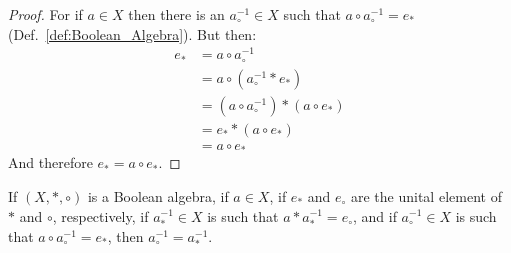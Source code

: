     \begin{proof}
        For if $a\in{X}$ then there is an $a_{\circ}^{\minus{1}}\in{X}$ such
        that $a\circ{a}_{\circ}^{\minus{1}}=e_{*}$
        (Def.~\ref{def:Boolean_Algebra}). But then:
        \begin{align}
            e_{*}&=a\circ{a}_{\circ}^{\minus{1}}
            \tag{Complement Property}\\
            &=a\circ(a_{\circ}^{\minus{1}}*e_{*})
            \tag{Identity}\\
            &=(a\circ{a}_{\circ}^{\minus{1}})*(a\circ{e}_{*})
            \tag{Distributivity}\\
            &=e_{*}*(a\circ{e}_{*})
            \tag{Complement Property}\\
            &=a\circ{e}_{*}
            \tag{Identity}
        \end{align}
        And therefore $e_{*}=a\circ{e}_{*}$.
    \end{proof}
    \begin{theorem}
        \label{thm:Bool_Comp_of_First_Op_is_Comp_of_Second_Op}
        If $(X,*,\circ)$ is a Boolean algebra, if $a\in{X}$, if
        $e_{*}$ and $e_{\circ}$ are the unital element of $*$ and $\circ$,
        respectively, if $a_{*}^{\minus{1}}\in{X}$ is such that
        $a*a_{*}^{\minus{1}}=e_{\circ}$, and if $a_{\circ}^{\minus{1}}\in{X}$
        is such that $a\circ{a}_{\circ}^{\minus{1}}=e_{*}$, then
        $a_{\circ}^{\minus{1}}=a_{*}^{\minus{1}}$.
    \end{theorem}
